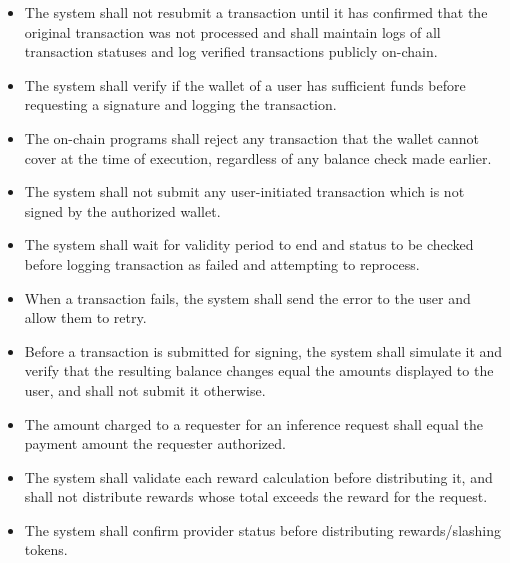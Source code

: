 \documentclass[12pt]{article}
\newcounter{sanum} %
\renewcommand{\thesanum}{FR.SA.\arabic{sanum}}
\begin{document}
\noindent \begin{itemize}

\item[\refstepcounter{sanum}\thesanum \label{SA_NoDuplicateSubmission}:]
The system shall not resubmit a transaction until it has confirmed that the original transaction was not processed and shall maintain logs of all transaction statuses and log verified transactions publicly on-chain.

\item[\refstepcounter{sanum}\thesanum \label{SA_BalanceCheck}:]
The system shall verify if the wallet of a user has sufficient funds before requesting a signature and logging the transaction.

\item[\refstepcounter{sanum}\thesanum \label{SA_OnChainFundsCheck}:]
The on-chain programs shall reject any transaction that the wallet cannot cover at the time of execution, regardless of any balance check made earlier.

\item[\refstepcounter{sanum}\thesanum \label{SA_SignedTransactionsOnly}:]
The system shall not submit any user-initiated transaction which is not
signed by the authorized wallet.

\item[\refstepcounter{sanum}\thesanum \label{SA_ExpiryCheck}:]
The system shall wait for validity period to end and status to be checked before logging transaction as failed and attempting to reprocess.

\item[\refstepcounter{sanum}\thesanum \label{SA_FailureRetry}:]
When a transaction fails, the system shall send the error to the user and allow them to retry.

\item[\refstepcounter{sanum}\thesanum \label{SA_TransactionSimulation}:]
Before a transaction is submitted for signing, the system shall simulate it and verify that the resulting balance changes equal the amounts displayed to the user, and shall not submit it otherwise.

\item[\refstepcounter{sanum}\thesanum \label{SA_ChargeEqualsAuthorized}:]
The amount charged to a requester for an inference request shall equal the payment amount the requester authorized.

\item[\refstepcounter{sanum}\thesanum \label{SA_RewardValidation}:]
The system shall validate each reward calculation before distributing it, and shall not distribute rewards whose total exceeds the reward for the request.

\item[\refstepcounter{sanum}\thesanum \label{SA_ProviderStatusCheck}:]
The system shall confirm provider status before distributing rewards/slashing tokens.

\end{itemize}
\end{document}
